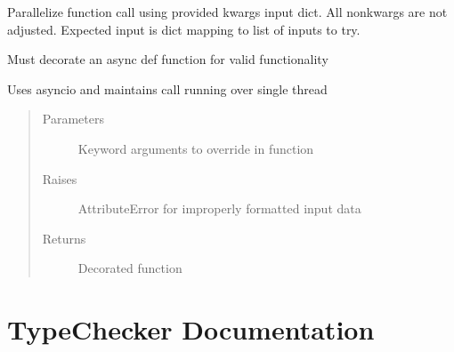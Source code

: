 \documentclass[letterpaper,10pt,english]{sphinxmanual}
\begin{document}

\begin{fulllineitems}
\label{\detokenize{api/parallel_iter:data_structures.parallel_iter.iter_async}}
Parallelize function call using provided kwargs input dict. All non\sphinxhyphen{}kwargs
are not adjusted. Expected input is dict mapping to list of inputs to try.

Must decorate an async def function for valid functionality

Uses asyncio and maintains call running over single thread
\begin{quote}\begin{description}
\item[{Parameters}] \leavevmode
{} \textendash{} Keyword arguments to override in function

\item[{Raises}] \leavevmode
AttributeError for improperly formatted input data

\item[{Returns}] \leavevmode
Decorated function

\end{description}\end{quote}

\end{fulllineitems}



\chapter{TypeChecker Documentation}
\label{\detokenize{api/type_checking:typechecker-documentation}}\label{\detokenize{api/type_checking::doc}}
\end{document}
